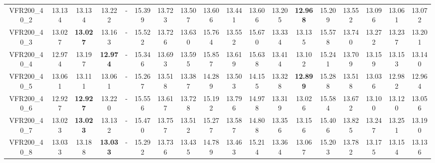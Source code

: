 \begin{tabular}{cc|ccc|ccccccccccccc}
VFR200\_40\_2      & 13.134           & 13.134           & 13.222           & -                & 15.399           & 13.723           & 13.507           & 13.606           & 13.441           & 13.606           & 13.205           & {\bf 12.968}     & 15.209           & 13.552           & 13.096           & 13.061           & 13.072          \\ 
VFR200\_40\_3      & 13.027           & {\bf 13.027}     & 13.163           & -                & 15.522           & 13.726           & 13.630           & 15.764           & 13.552           & 15.670           & 13.334           & 13.135           & 15.578           & 13.740           & 13.272           & 13.237           & 13.201          \\ 
VFR200\_40\_4      & 12.974           & 13.197           & {\bf 12.974}     & -                & 15.346           & 13.693           & 13.595           & 15.857           & 13.619           & 15.638           & 13.414           & 13.102           & 15.241           & 13.709           & 13.159           & 13.153           & 13.140          \\ 
VFR200\_40\_5      & 13.061           & 13.111           & 13.061           & -                & 15.267           & 13.518           & 13.387           & 14.289           & 13.503           & 14.155           & 13.328           & {\bf 12.899}     & 15.288           & 13.518           & 13.036           & 12.982           & 12.964          \\ 
VFR200\_40\_6      & 12.927           & {\bf 12.927}     & 13.220           & -                & 15.556           & 13.617           & 13.728           & 15.192           & 13.796           & 14.978           & 13.319           & 13.026           & 15.584           & 13.672           & 13.100           & 13.120           & 13.056          \\ 
VFR200\_40\_7      & 13.023           & {\bf 13.023}     & 13.132           & -                & 15.470           & 13.757           & 13.512           & 15.277           & 13.587           & 14.808           & 13.356           & 13.156           & 15.406           & 13.825           & 13.247           & 13.251           & 13.190          \\ 
VFR200\_40\_8      & 13.033           & 13.188           & {\bf 13.033}     & -                & 15.292           & 13.736           & 13.435           & 14.789           & 13.463           & 15.214           & 13.364           & 13.067           & 15.203           & 13.782           & 13.175           & 13.154           & 13.136          \\ 

\end{tabular}
